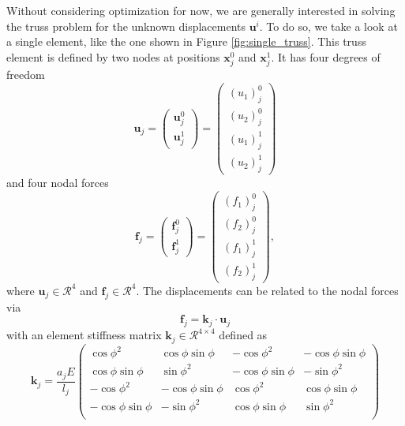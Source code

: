 Without considering optimization for now, we are generally interested in solving the truss problem for the unknown displacements $\mathbf{u}^i$. To do so, we take a look at a single element, like the one shown in Figure \ref{fig:single_truss}. This truss element is defined by two nodes at positions $\mathbf{x}^0_j$ and $\mathbf{x}^1_j$. It has four degrees of freedom 
\begin{equation}
    \mathbf{u}_j = 
    \begin{pmatrix}
        \mathbf{u}^0_j \\  \mathbf{u}^1_j
    \end{pmatrix}
    = 
    \begin{pmatrix}
        (u_1)^0_j \\ (u_2)^0_j \\  (u_1)^1_j \\ (u_2)^1_j
    \end{pmatrix}
\end{equation} 
and four nodal forces 
\begin{equation}
    \mathbf{f}_j = 
    \begin{pmatrix}
        \mathbf{f}^0_j \\  \mathbf{f}^1_j
    \end{pmatrix}
    = 
    \begin{pmatrix}
        (f_1)^0_j\\ (f_2)^0_j\\ (f_1)^1_j \\ (f_2)^1_j
    \end{pmatrix},
\end{equation} 
where $\mathbf{u}_j \in \mathcal{R}^4$ and $\mathbf{f}_j \in \mathcal{R}^4$. 
The displacements can be related to the nodal forces via 
\begin{equation}
    \mathbf{f}_j = \mathbf{k}_j \cdot \mathbf{u}_j
    \label{eq:local_truss_stiffness}
\end{equation}
with an element stiffness matrix $\mathbf{k}_j \in \mathcal{R}^{4\times4}$ defined as \cite{Christensen2008}
\begin{equation}
    \mathbf{k}_j = \frac{a_j E}{l_j}
    \begin{pmatrix}
    \cos{\phi}^2 & \cos{\phi}\sin{\phi} & -\cos{\phi}^2 & -\cos{\phi}\sin{\phi} \\
    \cos{\phi}\sin{\phi} & \sin{\phi}^2 & -\cos{\phi}\sin{\phi} & -\sin{\phi}^2 \\
    -\cos{\phi}^2 & -\cos{\phi}\sin{\phi} & \cos{\phi}^2 &\cos{\phi}\sin{\phi} \\
    -\cos{\phi}\sin{\phi} & -\sin{\phi}^2 & \cos{\phi}\sin{\phi} & \sin{\phi}^2 \\
    \end{pmatrix}
\end{equation}

